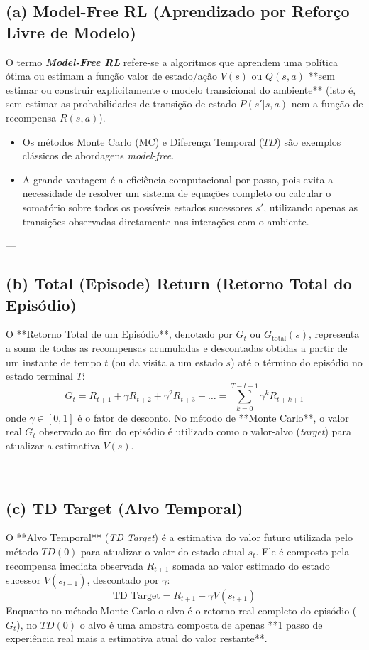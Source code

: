 \documentclass[a4paper,12pt]{article}
\begin{document}
\subsection*{(a) Model-Free RL (Aprendizado por Reforço Livre de Modelo)}
O termo \textbf{\textit{Model-Free RL}} refere-se a algoritmos que aprendem uma política ótima ou estimam a função valor de estado/ação $V(s)$ ou $Q(s,a)$ **sem estimar ou construir explicitamente o modelo transicional do ambiente** (isto é, sem estimar as probabilidades de transição de estado $P(s'|s,a)$ nem a função de recompensa $R(s,a)$). 
\begin{itemize}
	\item Os métodos Monte Carlo (MC) e Diferença Temporal ($TD$) são exemplos clássicos de abordagens \textit{model-free}.
	\item A grande vantagem é a eficiência computacional por passo, pois evita a necessidade de resolver um sistema de equações completo ou calcular o somatório sobre todos os possíveis estados sucessores $s'$, utilizando apenas as transições observadas diretamente nas interações com o ambiente.
\end{itemize}

---

\subsection*{(b) Total (Episode) Return (Retorno Total do Episódio)}
O **Retorno Total de um Episódio**, denotado por $G_t$ ou $G_{\text{total}}(s)$, representa a soma de todas as recompensas acumuladas e descontadas obtidas a partir de um instante de tempo $t$ (ou da visita a um estado $s$) até o término do episódio no estado terminal $T$:
\begin{equation}
	G_t = R_{t+1} + \gamma R_{t+2} + \gamma^2 R_{t+3} + \dots = \sum_{k=0}^{T - t - 1} \gamma^k R_{t+k+1}
\end{equation}
onde $\gamma \in [0, 1]$ é o fator de desconto. No método de **Monte Carlo**, o valor real $G_t$ observado ao fim do episódio é utilizado como o valor-alvo (\textit{target}) para atualizar a estimativa $V(s)$.

---

\subsection*{(c) TD Target (Alvo Temporal)}
O **Alvo Temporal** (\textit{TD Target}) é a estimativa do valor futuro utilizada pelo método $TD(0)$ para atualizar o valor do estado atual $s_t$. Ele é composto pela recompensa imediata observada $R_{t+1}$ somada ao valor estimado do estado sucessor $V(s_{t+1})$, descontado por $\gamma$:
\begin{equation}
	\text{TD Target} = R_{t+1} + \gamma V(s_{t+1})
\end{equation}
Enquanto no método Monte Carlo o alvo é o retorno real completo do episódio ($G_t$), no $TD(0)$ o alvo é uma amostra composta de apenas **1 passo de experiência real mais a estimativa atual do valor restante**.
\end{document}
